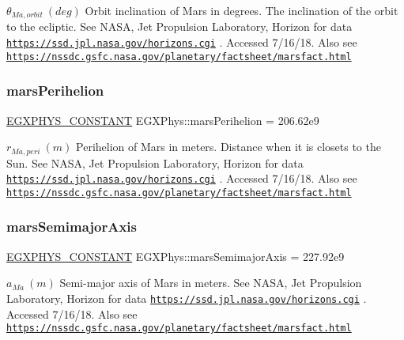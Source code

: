 $ \theta_{Ma,orbit} \ (deg)$ Orbit inclination of Mars in degrees. The inclination of the orbit to the ecliptic. See N\+A\+SA, Jet Propulsion Laboratory, Horizon for data \href{https://ssd.jpl.nasa.gov/horizons.cgi}{\tt https\+://ssd.\+jpl.\+nasa.\+gov/horizons.\+cgi} . Accessed 7/16/18. Also see \href{https://nssdc.gsfc.nasa.gov/planetary/factsheet/marsfact.html}{\tt https\+://nssdc.\+gsfc.\+nasa.\+gov/planetary/factsheet/marsfact.\+html} \mbox{\label{group___e_g_x_phys-_constants-_astrophysics-_solar_system-_mars-_orbit_gad152fa1e3e334641feaa60c0ddc96ac5}} 
\subsubsection{\texorpdfstring{mars\+Perihelion}{marsPerihelion}}
{\footnotesize\ttfamily \mbox{\hyperlink{group___e_g_x_phys-_constants-_macros_ga76980d288494ce1714c9ac68a95ba702}{E\+G\+X\+P\+H\+Y\+S\+\_\+\+C\+O\+N\+S\+T\+A\+NT}} E\+G\+X\+Phys\+::mars\+Perihelion = 206.\+62e9}

$ r_{Ma,peri} \ (m)$ Perihelion of Mars in meters. Distance when it is closets to the Sun. See N\+A\+SA, Jet Propulsion Laboratory, Horizon for data \href{https://ssd.jpl.nasa.gov/horizons.cgi}{\tt https\+://ssd.\+jpl.\+nasa.\+gov/horizons.\+cgi} . Accessed 7/16/18. Also see \href{https://nssdc.gsfc.nasa.gov/planetary/factsheet/marsfact.html}{\tt https\+://nssdc.\+gsfc.\+nasa.\+gov/planetary/factsheet/marsfact.\+html} \mbox{\label{group___e_g_x_phys-_constants-_astrophysics-_solar_system-_mars-_orbit_ga935e021c979125036dac5a579fd3d2eb}} 
\subsubsection{\texorpdfstring{mars\+Semimajor\+Axis}{marsSemimajorAxis}}
{\footnotesize\ttfamily \mbox{\hyperlink{group___e_g_x_phys-_constants-_macros_ga76980d288494ce1714c9ac68a95ba702}{E\+G\+X\+P\+H\+Y\+S\+\_\+\+C\+O\+N\+S\+T\+A\+NT}} E\+G\+X\+Phys\+::mars\+Semimajor\+Axis = 227.\+92e9}

$ a_{Ma} \ (m)$ Semi-\/major axis of Mars in meters. See N\+A\+SA, Jet Propulsion Laboratory, Horizon for data \href{https://ssd.jpl.nasa.gov/horizons.cgi}{\tt https\+://ssd.\+jpl.\+nasa.\+gov/horizons.\+cgi} . Accessed 7/16/18. Also see \href{https://nssdc.gsfc.nasa.gov/planetary/factsheet/marsfact.html}{\tt https\+://nssdc.\+gsfc.\+nasa.\+gov/planetary/factsheet/marsfact.\+html} \mbox{\label{group___e_g_x_phys-_constants-_astrophysics-_solar_system-_mars-_orbit_gae41c786d33b9f7f2f5b1db07e4ed6fbf}} 

